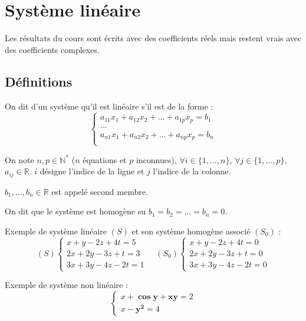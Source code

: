\documentclass[10pt]{article}
\begin{document}
\setlength{\parskip}{0ex plus 0.2ex minus 0ex}
 \renewcommand{\contentsname}{}
 \renewcommand{\baselinestretch}{1}

\tableofcontents

 \renewcommand{\baselinestretch}{1.2}
\setlength{\parskip}{2ex plus 0.5ex minus 0.2ex}





\section{Système linéaire}
\begin{rem}
Les résultats du cours sont écrits avec des coefficients réels mais restent vrais avec des coefficients complexes. 
\end{rem}

\subsection{Définitions}
\begin{defi}
On dit d'un système qu'il est linéaire s'il est de la forme :
$$
\left\{
\begin{array}{l}
a_{11}x_1 + a_{12}x_2 + ... + a_{1p}x_p = b_1 \\
... \\ 
a_{n1}x_1 + a_{n2}x_2 + ... + a_{np}x_p = b_n \\
\end{array}
\right.
$$

On note $n,p\in \mathbb{N}^*$ ($n$ équations et $p$ inconnues), $\forall i\in \{1,...,n\}$, $\forall j\in \{1,...,p\}$, $a_{ij} \in \mathbb{R}$. $i$ désigne l'indice de la ligne et $j$ l'indice de la colonne. 

$b_1, ..., b_n \in \mathbb{R}$ est appelé second membre. 
\end{defi}

\begin{defi}
On dit que le système est homogène su $b_1=b_2=...=b_n=0$.
\end{defi}


\begin{exemple}
Exemple de système linéaire $(S)$ et son système homogène associé $(S_0)$ :
$$
(S) \left\{
\begin{array}{l}
x+y-2z + 4t = 5 \\
2x+2y-3z+t=3 \\
3x+3y-4z-2t=1
\end{array}
\right.
\quad
(S_0) \left\{
\begin{array}{l}
x+y-2z + 4t = 0 \\
2x+2y-3z+t=0 \\
3x+3y-4z-2t=0
\end{array}
\right.
$$

Exemple de système non linéaire :
$$
\left\{
\begin{array}{l}
x+\mathbf{\cos y} + \mathbf{xy} =2 \\
x-\mathbf{y^2} = 4
\end{array}
\right.$$



\end{exemple}
\end{document}
